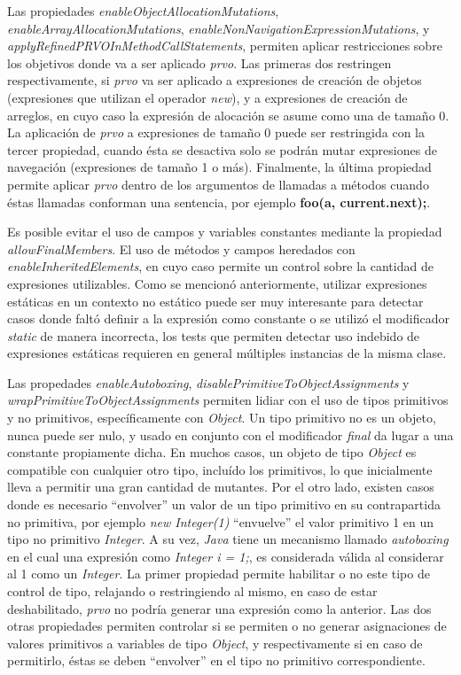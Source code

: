 Las propiedades \emph{enableObjectAllocationMutations}, \emph{enableArrayAllocationMutations}, \emph{enableNonNavigationExpressionMutations}, y \emph{applyRefinedPRVOInMethodCallStatements}, permiten aplicar restricciones sobre los objetivos donde va a ser aplicado \emph{prvo}. Las primeras dos restringen respectivamente, si \emph{prvo} va ser aplicado a expresiones de creaci\'on de objetos (expresiones que utilizan el operador \emph{new}), y a expresiones de creaci\'on de arreglos, en cuyo caso la expresi\'on de alocaci\'on se asume como una de tama\~no 0. La aplicaci\'on de \emph{prvo} a expresiones de tama\~no 0 puede ser restringida con la tercer propiedad, cuando \'esta se desactiva solo se podr\'an mutar expresiones de navegaci\'on (expresiones de tama\~no 1 o m\'as). Finalmente, la \'ultima propiedad permite aplicar \emph{prvo} dentro de los argumentos de llamadas a m\'etodos cuando \'estas llamadas conforman una sentencia, por ejemplo \textbf{foo(a, current.next);}.

Es posible evitar el uso de campos y variables constantes mediante la propiedad \emph{allowFinalMembers}. El uso de m\'etodos y campos heredados con \emph{enableInheritedElements}, en cuyo caso permite un control sobre la cantidad de expresiones utilizables. Como se mencion\'o anteriormente, utilizar expresiones est\'aticas en un contexto no est\'atico puede ser muy interesante para detectar casos donde falt\'o definir a la expresi\'on como constante o se utiliz\'o el modificador \emph{static} de manera incorrecta, los tests que permiten detectar uso indebido de expresiones est\'aticas requieren en general m\'ultiples instancias de la misma clase.

Las propedades \emph{enableAutoboxing}, \emph{disablePrimitiveToObjectAssignments} y \emph{wrapPrimitiveToObjectAssignments} permiten lidiar con el uso de tipos primitivos y no primitivos, espec\'ificamente con \emph{Object}. Un tipo primitivo no es un objeto, nunca puede ser nulo, y usado en conjunto con el modificador \emph{final} da lugar a una constante propiamente dicha. En muchos casos, un objeto de tipo \emph{Object} es compatible con cualquier otro tipo, inclu\'ido los primitivos, lo que inicialmente lleva a permitir una gran cantidad de mutantes. Por el otro lado, existen casos donde es necesario ``envolver'' un valor de un tipo primitivo en su contrapartida no primitiva, por ejemplo \emph{new Integer(1)} ``envuelve'' el valor primitivo 1 en un tipo no primitivo \emph{Integer}. A su vez, \emph{Java} tiene un mecanismo llamado \emph{autoboxing} en el cual una expresi\'on como \emph{Integer i = 1;}, es considerada v\'alida al considerar al 1 como un \emph{Integer}. La primer propiedad permite habilitar o no este tipo de control de tipo, relajando o restringiendo al mismo, en caso de estar deshabilitado, \emph{prvo} no podr\'ia generar una expresi\'on como la anterior. Las dos otras propiedades permiten controlar si se permiten o no generar asignaciones de valores primitivos a variables de tipo \emph{Object}, y respectivamente si en caso de permitirlo, \'estas se deben ``envolver'' en el tipo no primitivo correspondiente.

